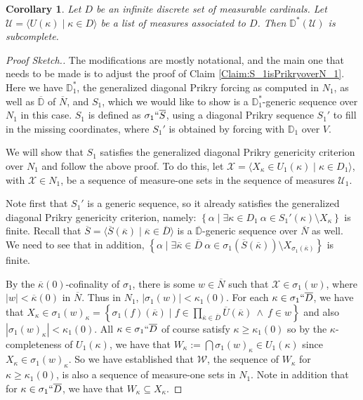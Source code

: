 \documentclass{amsart}
\newtheorem{corollary}[theorem]{Corollary}
\theoremstyle{definition}
\theoremstyle{remark}
\newcommand{\D}{\mathbb{D}}
\newcommand{\N}{{\overline{N}}}
\renewcommand{\S}{{\overline{S}}}
\newcommand{\U}{\mathcal{U}}
\newcommand{\st}{\; | \;}
\newcommand{\set}[2]{\left\{#1\st #2 \right\}}
\newcommand{\seq}[2]{\langle #1 \st #2 \rangle}
\begin{document}
\begin{corollary} 
Let $D$ be an infinite discrete set of measurable cardinals. Let $\U = \seq{ U(\kappa) }{ \kappa \in D }$ be a list of measures associated to $D$. Then $\D^*(\U)$ is subcomplete.
\end{corollary}
\begin{proof}[Proof Sketch.]
The modifications are mostly notational, and the main one that needs to be made is to adjust the proof of Claim \ref{Claim:S_1isPrikryoverN_1}. Here we have $\D^*_1$, the generalized diagonal Prikry forcing as computed in $N_1$, as well as $\overline{\D}$ of $\N$, 
and $S_1$, which we would like to show is a $\D_1^*$-generic sequence over $N_1$ in this case. $S_1$ is defined as $\sigma_1 ``\overline S$, using a diagonal Prikry sequence $S_1'$ to fill in the missing coordinates, where $S_1'$ is obtained by forcing with $\D_1$ over $V$.

We will show that $S_1$ satisfies the generalized diagonal Prikry genericity criterion over $N_1$ and follow the above proof. To do this, let $\mathcal X = \seq{ X_\kappa \in U_1(\kappa) }{ \kappa \in D_1 }$, with $\mathcal X \in N_1$, be a sequence of measure-one sets in the sequence of measures $\U_1$.

Note first that $S_1'$ is a generic sequence, so it already satisfies the generalized diagonal Prikry genericity criterion, namely:
$\set{ \alpha }{ \exists \kappa \in D_1 \ \alpha \in S_1'(\kappa) \setminus X_\kappa }$ is finite.
Recall that $\S = \seq{ \S(\overline \kappa) }{ \overline \kappa \in \overline D }$ is a $\overline{\D}$-generic sequence over $\N$ as well.
We need to see that in addition, $\set{ \alpha }{ \exists \overline \kappa \in \overline D \ \alpha \in \sigma_1(\S(\overline \kappa)) \setminus X_{\sigma_1(\overline \kappa)} }$ is finite.

By the $\overline{\kappa}(0)$-cofinality of $\sigma_1$, there is some $w \in \N$ such that $\mathcal X \in \sigma_1(w)$, where $|w| < \overline{\kappa}(0)$ in $\N$. Thus in $N_1$, $|\sigma_1(w)| < \kappa_1(0)$. 
For each $\kappa \in \sigma_1``\overline D$, we have that $X_\kappa \in \sigma_1(w)_\kappa = \set{\sigma_1(f)(\overline \kappa) }{ f \in \prod_{\overline \kappa \in \overline D} \overline U(\overline \kappa) \ \land \ f \in w }$ and also $|\sigma_1(w)_\kappa|<\kappa_1(0).$ All $\kappa \in \sigma_1``\overline D$ of course satisfy $\kappa \geq \kappa_1(0)$ so by the $\kappa$-completeness of $U_1(\kappa)$, we have that $W_\kappa := \bigcap \sigma_1(w)_\kappa \in U_1(\kappa)$ since $X_\kappa \in \sigma_1(w)_\kappa$.
So we have established that $\mathcal W$, the sequence of $W_\kappa$ for $\kappa \geq \kappa_1(0)$, is also a sequence of measure-one sets in $N_1$. Note in addition that for $\kappa \in \sigma_1``\overline D$, we have that $W_\kappa \subseteq X_\kappa$. 


\end{proof}
\end{document}
